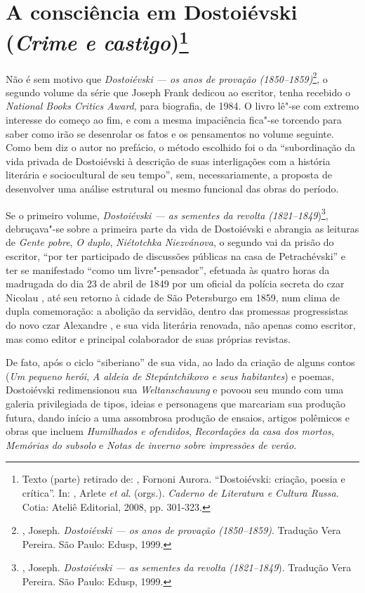 {{\chapter{A consciência em Dostoiévski (\emph{Crime e castigo})\footnote{Texto (parte) retirado de: , Fornoni Aurora. ``Dostoiévski: criação, poesia e crítica''. In: , Arlete \emph{et al}. (orgs.). \emph{Caderno de Literatura e Cultura Russa}. Cotia: Ateliê Editorial, 2008, pp. 301-323.}}

Não é sem motivo que \emph{Dostoiévski --- os anos de provação (1850--1859)}\footnote{, Joseph. \emph{Dostoiévski --- os anos de   provação (1850--1859)}. Tradução Vera Pereira. São Paulo: Edusp, 1999.}, o segundo volume da série que Joseph Frank dedicou ao escritor, tenha recebido o \emph{National Books Critics Award}, para biografia, de 1984. O livro lê"-se com extremo interesse do começo ao fim, e com a mesma impaciência fica"-se torcendo para saber como irão se desenrolar os fatos
e os pensamentos no volume seguinte. Como bem diz o autor no prefácio, o método escolhido foi o da ``subordinação da vida privada de Dostoiévski à descrição de suas interligações com a história literária e sociocultural de seu tempo'', sem, necessariamente, a proposta de desenvolver uma análise estrutural ou mesmo funcional das obras do período.

Se o primeiro volume, \emph{Dostoiévski --- as sementes da revolta
(1821--1849})\footnote{, Joseph. \emph{Dostoiévski --- as sementes
  da revolta (1821--1849}). Tradução Vera Pereira. São Paulo: Edusp,
  1999.}, debruçava"-se sobre a primeira parte da vida de Dostoiévski e
abrangia as leituras de \emph{Gente pobre}, \emph{O duplo},
\emph{Niétotchka Niezvánova}, o segundo vai da prisão do escritor, ``por
ter participado de discussões públicas na casa de Petrachévski'' e ter
se manifestado ``como um livre"-pensador'', efetuada às quatro horas da
madrugada do dia 23 de abril de 1849 por um oficial da polícia secreta
do czar Nicolau , até seu retorno à cidade de São Petersburgo em 1859,
num clima de dupla comemoração: a abolição da servidão, dentro das
promessas progressistas do novo czar Alexandre , e sua vida literária
renovada, não apenas como escritor, mas como editor e principal
colaborador de suas próprias revistas.

De fato, após o ciclo ``siberiano'' de sua vida, ao lado da criação de
alguns contos (\emph{Um pequeno herói}, \emph{A aldeia de Stepántchikovo
e seus habitantes}) e poemas, Dostoiévski redimensionou sua
\emph{Weltanschauung} e povoou seu mundo com uma galeria privilegiada de
tipos, ideias e personagens que marcariam sua produção futura, dando
início a uma assombrosa produção de ensaios, artigos polêmicos e obras
que incluem \emph{Humilhados e ofendidos}, \emph{Recordações da casa dos
mortos}, \emph{Memórias do subsolo} e \emph{Notas de inverno sobre
impressões de verão}.

}}
